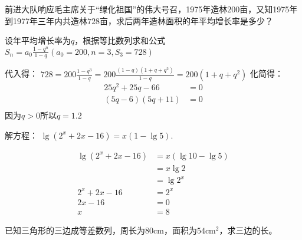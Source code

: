 \documentclass[answers]{exam}
\begin{document}
\begin{questions}
\begin{solution}
	\end{solution}
	\question
	前进大队响应毛主席关于\enquote{绿化祖国}的伟大号召，1975年造林$200$亩，又知1975年到1977年三年内共造林$728$亩，求后两年造林面积的年平均增长率是多少？
	\begin{solution}
		设年平均增长率为$q$，根据等比数列求和公式
		\begin{math}
			S_n = a_0\frac{1-q^n}{1-q} (a_0 = 200, n = 3, S_3 = 728)
		\end{math}

		代入得：
		\begin{math}
			728 = 200 \frac{1-q^3}{1-q} = 200 \frac{(1-q)(1 + q + q^2)}{1-q} = 200(1 + q + q^2)
		\end{math}
		化简得：
		\begin{align*}
			25q^2 + 25q - 66  & = 0 \\
			(5q - 6)(5q + 11) & = 0 \\
		\end{align*}
		因为$q > 0$所以$q=1.2$
	\end{solution}

	\question 解方程：
	\begin{math}
		\lg(2^x + 2x - 16) = x(1-\lg5)
	\end{math}.
	\begin{solution}
		\begin{align*}
			\lg(2^x + 2x - 16) & = x(\lg10 - \lg5) \\
			                   & = x\lg2           \\
			                   & = \lg2^x          \\
			2^x + 2x - 16      & = 2^x             \\
			2x - 16            & = 0               \\
			x                  & = 8
		\end{align*}
	\end{solution}

	\question 已知三角形的三边成等差数列，周长为$80$cm，面积为$54$cm$^2$，求三边的长。
	\begin{solution}



\end{solution}
\end{questions}
\end{document}
